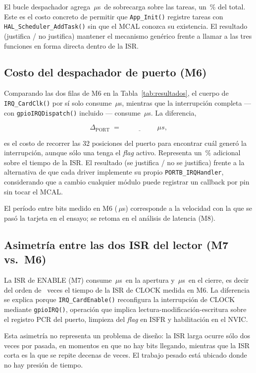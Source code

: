 \documentclass[11pt,a4paper]{article}
\newcommand{\dato}[1][2cm]{\underline{\hspace{#1}}}
\newcommand{\us}{\ensuremath{\mu}s}
\begin{document}
El bucle despachador agrega \dato\,\us\ de sobrecarga sobre las tareas, un
\dato\,\% del total. Este es el costo concreto de permitir que
\texttt{App\_Init()} registre tareas con \texttt{HAL\_Scheduler\_AddTask()}
sin que el MCAL conozca su existencia. El resultado \dato{} (justifica / no
justifica) mantener el mecanismo genérico frente a llamar a las tres
funciones en forma directa dentro de la ISR.

\subsection{Costo del despachador de puerto (M6)}

Comparando las dos filas de M6 en la Tabla~\ref{tab:resultados}, el cuerpo
de \texttt{IRQ\_CardClk()} por sí solo consume \dato\,\us, mientras que la
interrupción completa --- con \texttt{gpioIRQDispatch()} incluido ---
consume \dato\,\us. La diferencia,

\[
\Delta_{\text{PORT}} \;=\; \dato\,\us,
\]

es el costo de recorrer las 32 posiciones del puerto para encontrar cuál
generó la interrupción, aunque sólo una tenga el \textit{flag} activo.
Representa un \dato\,\% adicional sobre el tiempo de la ISR. El resultado
\dato{} (se justifica / no se justifica) frente a la alternativa de que
cada driver implemente su propio \texttt{PORTB\_IRQHandler}, considerando
que a cambio cualquier módulo puede registrar un callback por pin sin tocar
el MCAL.

El período entre bits medido en M6 (\dato\,\us) corresponde a la velocidad
con la que se pasó la tarjeta en el ensayo; se retoma en el análisis de
latencia (M8).

\subsection{Asimetría entre las dos ISR del lector (M7 vs.\ M6)}

La ISR de ENABLE (M7) consume \dato\,\us\ en la apertura y \dato\,\us\ en
el cierre, es decir del orden de \dato\ veces el tiempo de la ISR de CLOCK
medida en M6. La diferencia se explica porque \texttt{IRQ\_CardEnable()}
reconfigura la interrupción de CLOCK mediante \texttt{gpioIRQ()}, operación
que implica lectura-modificación-escritura sobre el registro PCR del
puerto, limpieza del \textit{flag} en ISFR y habilitación en el NVIC.

Esta asimetría no representa un problema de diseño: la ISR larga ocurre
sólo dos veces por pasada, en momentos en que no hay bits llegando, mientras
que la ISR corta es la que se repite decenas de veces. El trabajo pesado
está ubicado donde no hay presión de tiempo.
\end{document}

